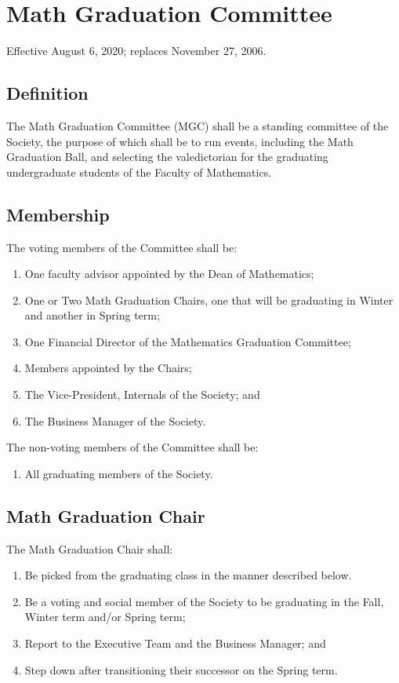 \section{Math Graduation Committee}
Effective August 6, 2020; replaces November 27, 2006.

\subsection{Definition}
The Math Graduation Committee (MGC) shall be a standing committee of the Society, the 
purpose of which shall be to run events, including the Math Graduation Ball, and 
selecting the valedictorian for the graduating undergraduate students of the Faculty 
of Mathematics.

\subsection{Membership}
The voting members of the Committee shall be:
\begin{enumerate}
\item One faculty advisor appointed by the Dean of Mathematics;
\item One or Two Math Graduation Chairs, one that will be graduating in Winter and 
another in Spring term;
\item One Financial Director of the Mathematics Graduation Committee;
\item Members appointed by the Chairs;
\item The Vice-President, Internals of the Society; and 
\item The Business Manager of the Society.
\end{enumerate}
The non-voting members of the Committee shall be:
\begin{enumerate}
\item All graduating members of the Society.
\end{enumerate}

\subsection{Math Graduation Chair}
The Math Graduation Chair shall:
\begin{enumerate}
\item Be picked from the graduating class in the manner described below.
\item Be a voting and social member of the Society to be graduating in the Fall, 
Winter term and/or Spring term;
\item Report to the Executive Team and the Business Manager; and 
\item Step down after transitioning their successor on the Spring term.
\end{enumerate}

